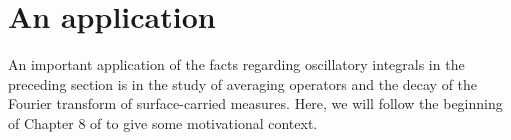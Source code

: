 \documentclass[11pt, letter]{book}
\begin{document}











\section{An application}\label{sec:estimating_SigmaHat}


An important application of the facts regarding oscillatory integrals in the preceding section is in the study of averaging operators and the decay of the Fourier transform of surface-carried measures. Here, we will follow the beginning of Chapter 8 of \cite{SteinFunctionalAnalysis} to give some motivational context. \\
\end{document}
